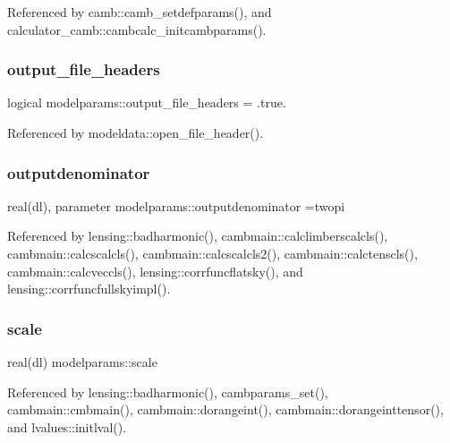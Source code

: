 Referenced by camb\+::camb\+\_\+setdefparams(), and calculator\+\_\+camb\+::cambcalc\+\_\+initcambparams().

\mbox{\label{namespacemodelparams_aa59993fb52b4f0010f0587e10f27b792}} 
\subsubsection{\texorpdfstring{output\+\_\+file\+\_\+headers}{output\_file\_headers}}
{\footnotesize\ttfamily logical modelparams\+::output\+\_\+file\+\_\+headers = .true.}



Referenced by modeldata\+::open\+\_\+file\+\_\+header().

\mbox{\label{namespacemodelparams_abb77cb9ffb6e4c47f4bbb5817f675840}} 
\subsubsection{\texorpdfstring{outputdenominator}{outputdenominator}}
{\footnotesize\ttfamily real(dl), parameter modelparams\+::outputdenominator =twopi}



Referenced by lensing\+::badharmonic(), cambmain\+::calclimberscalcls(), cambmain\+::calcscalcls(), cambmain\+::calcscalcls2(), cambmain\+::calctenscls(), cambmain\+::calcveccls(), lensing\+::corrfuncflatsky(), and lensing\+::corrfuncfullskyimpl().

\mbox{\label{namespacemodelparams_adc3b09efaf8a6d37303ccd19e27ae6e3}} 
\subsubsection{\texorpdfstring{scale}{scale}}
{\footnotesize\ttfamily real(dl) modelparams\+::scale}



Referenced by lensing\+::badharmonic(), cambparams\+\_\+set(), cambmain\+::cmbmain(), cambmain\+::dorangeint(), cambmain\+::dorangeinttensor(), and lvalues\+::initlval().

